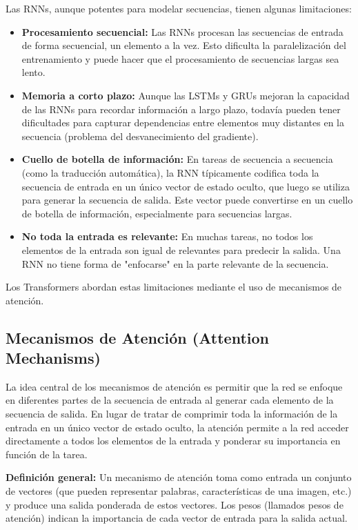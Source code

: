 \documentclass{article}
\begin{document}
Las RNNs, aunque potentes para modelar secuencias, tienen algunas limitaciones:

\begin{itemize}
    \item \textbf{Procesamiento secuencial:}  Las RNNs procesan las secuencias de entrada de forma secuencial, un elemento a la vez.  Esto dificulta la paralelización del entrenamiento y puede hacer que el procesamiento de secuencias largas sea lento.
    \item \textbf{Memoria a corto plazo:}  Aunque las LSTMs y GRUs mejoran la capacidad de las RNNs para recordar información a largo plazo, todavía pueden tener dificultades para capturar dependencias entre elementos muy distantes en la secuencia (problema del desvanecimiento del gradiente).
    \item \textbf{Cuello de botella de información:} En tareas de secuencia a secuencia (como la traducción automática), la RNN típicamente codifica toda la secuencia de entrada en un único vector de estado oculto, que luego se utiliza para generar la secuencia de salida.  Este vector puede convertirse en un cuello de botella de información, especialmente para secuencias largas.
    \item \textbf{No toda la entrada es relevante:} En muchas tareas, no todos los elementos de la entrada son igual de relevantes para predecir la salida. Una RNN no tiene forma de "enfocarse" en la parte relevante de la secuencia.

\end{itemize}

Los Transformers abordan estas limitaciones mediante el uso de mecanismos de atención.

\subsection{Mecanismos de Atención (Attention Mechanisms)}

La idea central de los mecanismos de atención es permitir que la red se enfoque en diferentes partes de la secuencia de entrada al generar cada elemento de la secuencia de salida.  En lugar de tratar de comprimir toda la información de la entrada en un único vector de estado oculto, la atención permite a la red acceder directamente a todos los elementos de la entrada y ponderar su importancia en función de la tarea.

\textbf{Definición general:} Un mecanismo de atención toma como entrada un conjunto de vectores (que pueden representar palabras, características de una imagen, etc.) y produce una salida ponderada de estos vectores.  Los pesos (llamados pesos de atención) indican la importancia de cada vector de entrada para la salida actual.
\end{document}
